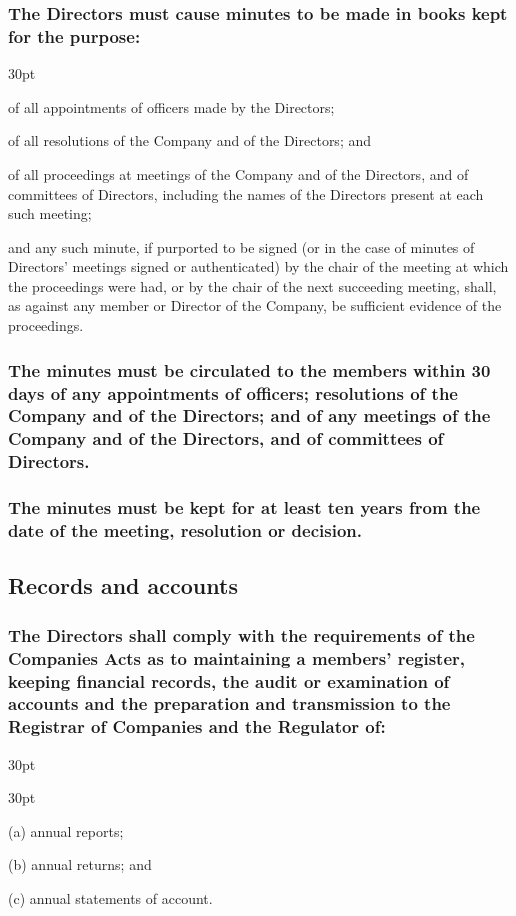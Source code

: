 \documentclass[12pt]{article}
\def\clauseindent{30pt}
\newenvironment{subindentpara}{\begin{adjustwidth}{\clauseindent}{}\begin{hanginglist}}{\end{hanginglist}\end{adjustwidth}}
\newenvironment{subindentlist}{\begin{adjustwidth}{\clauseindent}{}\begin{labeledlist}{\clauseindent}}{\end{labeledlist}\end{adjustwidth}}
\begin{document}
\subsubsection[Specifcs of records of minutes]{The Directors must cause minutes to be made in books kept for the purpose:}
\begin{subindentpara}
    \item of all appointments of officers made by the Directors;
    \item of all resolutions of the Company and of the Directors; and
    \item of all proceedings at meetings of the Company and of the Directors, and of committees of Directors, including the names of the Directors present at each such meeting;
    \item and any such minute, if purported to be signed (or in the case of minutes of Directors' meetings signed or authenticated) by the chair of the meeting at which the proceedings were had, or by the chair of the next succeeding meeting, shall, as against any member or Director of the Company, be sufficient evidence of the proceedings.
\end{subindentpara}
\subsubsection[Circulation of minutes]{The minutes must be circulated to the members within 30 days of any appointments of officers; resolutions of the Company and of the Directors; and of any meetings of the Company and of the Directors, and of committees of Directors.}
\subsubsection[Archives of minutes]{The minutes must be kept for at least ten years from the date of the meeting, resolution or decision.}

\subsection{Records and accounts}
\subsubsection[Specifcs of records and accounts]{The Directors shall comply with the requirements of the Companies Acts as to maintaining a members' register, keeping financial records, the audit or examination of accounts and the preparation and transmission to the Registrar of Companies and the Regulator of:}
\begin{subindentlist}
    \item [(a)] annual reports;
    \item [(b)] annual returns; and
    \item [(c)] annual statements of account.
\end{subindentlist}
\end{document}

